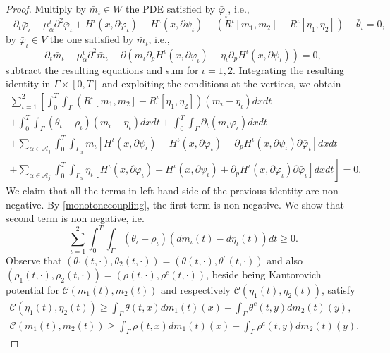 \documentclass[smallextended,referee,envcountsect,]{svjour3}
\newcommand{\cA}{{\mathcal A}}
\newcommand{\cC}{{\mathcal C}}
\renewcommand{\phi}{\varphi}
\renewcommand{\a}{{\alpha}}
\renewcommand{\th}{\theta}
\begin{document}
\begin{proof}
\par
{ Multiply by $\bar m_\iota\in W$ the PDE satisfied by $\bar\phi_\iota$, i.e.,
$$
-\partial_t\bar\phi_\iota-\mu^\iota_{\a}\partial^2\bar\phi_\iota+H^\iota(x, \partial\phi_\iota)-H^\iota(x, \partial\psi_\iota)-(R^\iota[m_1, m_2]-R^\iota[\eta_1, \eta_2])- \bar\theta_\iota=0,
$$
by $\bar\phi_\iota\in V$ the one satisfied by $\bar m_\iota$, i.e.,
$$
\partial_t\bar m_\iota-\mu^\iota_{\a}\partial^2\bar m_\iota-\partial(m_\iota\partial_pH^\iota(x, \partial\phi_\iota)-\eta_\iota\partial_pH^\iota(x, \partial\psi_\iota))=0,
$$
subtract the resulting equations and sum for $\iota=1,2$. Integrating the resulting identity in $\Gamma\times[0, T]$ and exploiting the conditions at the vertices, we obtain}
\begin{multline}
\label{uniqueness_sum}
\sum_{\iota=1}^2\left[\int_0^T\int_{\Gamma}(R^\iota[m_1, m_2]-R^\iota[\eta_1, \eta_2])(m_\iota-\eta_\iota)dxdt\right.\\
\left.+\int_0^T\int_{\Gamma}(\theta_\iota-\rho_\iota)(m_\iota-\eta_\iota)dxdt+\int_0^T\int_{\Gamma}\partial_t(\bar m_\iota\bar\phi_\iota)dxdt\right. \\
\left.+\sum_{\a\in\cA_j}\int_0^T\int_{\Gamma_{\a}}m_\iota[H^\iota(x, \partial\psi_\iota)-H^\iota(x, \partial\phi_\iota)-\partial_pH^\iota(x, \partial\psi_\iota)\partial\bar\phi_\iota]dxdt\right.\\
\left.+\sum_{\a\in\cA_j}\int_0^T\int_{\Gamma_{\a}}\eta_\iota[H^\iota(x, \partial\phi_\iota)-H^\iota(x, \partial\psi_\iota)+\partial_pH^\iota(x, \partial\phi_\iota)\partial\bar\phi_\iota]dxdt\right]=0.
\end{multline}
We claim that all the terms in left hand side of the previous identity are non negative. By \eqref{monotonecoupling}, the first term is non negative. We show that second term is non negative, i.e.
\begin{equation}
\label{monotonecoupling2}
\sum_{\iota=1}^2\int_0^T\int_{\Gamma}(\theta_\iota-\rho_\iota)(dm_\iota(t)-d\eta_\iota(t))dt\geq0.
\end{equation}
Observe that $(\theta_1(t, \cdot), \theta_2(t, \cdot))=(\th(t, \cdot), \th^c(t, \cdot))$ and also 
$(\rho_1(t, \cdot), \rho_2(t, \cdot))=(\rho(t, \cdot), \rho^c(t, \cdot))$, 
 beside  being   Kantorovich potential for $ \cC(m_1(t), m_2(t))$ and respectively $ \cC(\eta_1(t), \eta_2(t))$, satisfy
\begin{align*}
	 \cC(\eta_1(t), \eta_2(t))\ge \int_{\Gamma}\th(t, x)dm_1(t)(x)+\int_{\Gamma}\th^c(t, y)dm_2(t)(y),
 \\
	 \cC(m_1(t), m_2(t))\ge \int_{\Gamma}\rho(t, x)dm_1(t)(x)+\int_{\Gamma}\rho^c(t, y)dm_2(t)(y).

\end{align*}
\end{proof}
\end{document}
